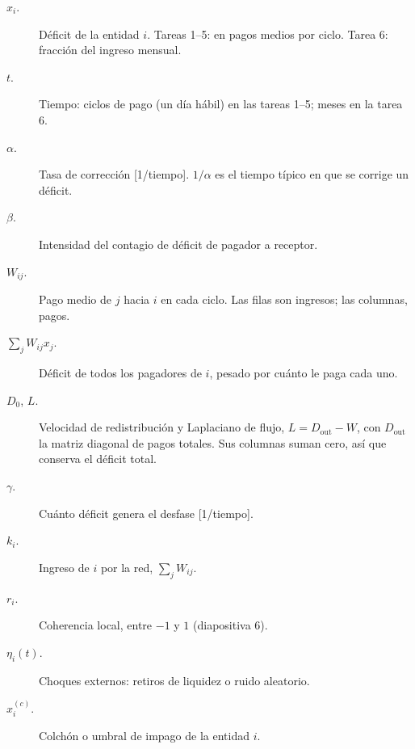 \begin{terminos}
\begin{description}
\item[$x_i$.] Déficit de la entidad $i$. Tareas 1–5: en pagos medios por ciclo. Tarea 6:
fracción del ingreso mensual.
\item[$t$.] Tiempo: ciclos de pago (un día hábil) en las tareas 1–5; meses en la tarea 6.
\item[$\alpha$.] Tasa de corrección [1/tiempo]. $1/\alpha$ es el tiempo típico en que se
corrige un déficit.
\item[$\beta$.] Intensidad del contagio de déficit de pagador a receptor.
\item[$W_{ij}$.] Pago medio de $j$ hacia $i$ en cada ciclo. Las filas son ingresos; las
columnas, pagos.
\item[$\sum_jW_{ij}x_j$.] Déficit de todos los pagadores de $i$, pesado por cuánto le
paga cada uno.
\item[$D_0$, $L$.] Velocidad de redistribución y Laplaciano de flujo, $L=D_\text{out}-W$,
con $D_\text{out}$ la matriz diagonal de pagos totales. Sus columnas suman cero, así que
conserva el déficit total.
\item[$\gamma$.] Cuánto déficit genera el desfase [1/tiempo].
\item[$k_i$.] Ingreso de $i$ por la red, $\sum_jW_{ij}$.
\item[$r_i$.] Coherencia local, entre $-1$ y $1$ (diapositiva 6).
\item[$\eta_i(t)$.] Choques externos: retiros de liquidez o ruido aleatorio.
\item[$x_i^{(c)}$.] Colchón o umbral de impago de la entidad $i$.
\end{description}
\end{terminos}
\begin{preguntas}
\end{preguntas}

